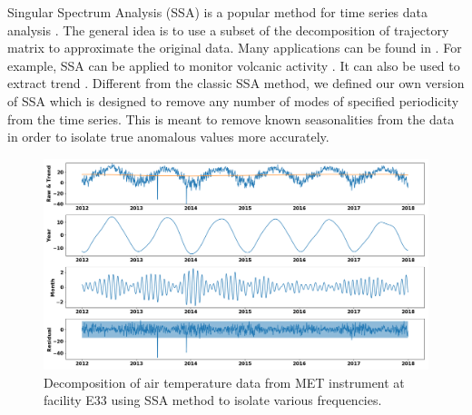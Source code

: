 Singular Spectrum Analysis (SSA) is a popular method for time series
data analysis \cite{golyandina2013singular,golyandina2014basic}. The
general idea is to use a subset of the decomposition of trajectory
matrix to approximate the original data. Many applications can be found
in \cite{golyandina2013singular}. For example, SSA can be applied to
monitor volcanic activity \cite{bozzo2010relationship}. It can also be
used to extract trend \cite{alexandrov2008method}. Different from the
classic SSA method, we defined our own version of SSA which is designed
to remove any number of modes of specified periodicity from the time
series. This is meant to remove known seasonalities from the data in 
order to isolate true anomalous values more accurately. 

\begin{figure}[ht]
    \centering
    \includegraphics[width=\textwidth]{figures/E33.png}
    \caption{Decomposition of air temperature data from MET
		instrument at facility E33 using SSA method to isolate various
			frequencies.}
    \label{fig:ssa}
\end{figure}

